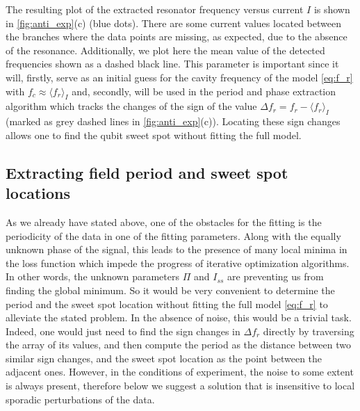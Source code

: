 \documentclass[%
 aip,
 amsmath,amssymb,
 reprint,%
]{revtex4-1}
\begin{document}
The resulting plot of the extracted resonator frequency versus current $I$ is shown in \autoref{fig:anti_exp}(c) (blue dots). There are some current values located between the branches where the data points are missing, as expected, due to the absence of the resonance. Additionally, we plot here the mean value of the detected frequencies shown as a dashed black line. This parameter is important since it will, firstly, serve as an initial guess for the cavity frequency of the model \eqref{eq:f_r} with $f_c \approx \langle f_r \rangle_{I}$ and, secondly, will be used in the period and phase extraction algorithm which tracks the changes of the sign of the value $\Delta f_r = f_r - \langle f_r \rangle_{I}$ (marked as grey dashed lines in \autoref{fig:anti_exp}(c)). Locating these sign changes allows one to find the qubit sweet spot without fitting the full model.

\subsection{Extracting field period and sweet spot locations}

As we already have stated above, one of the obstacles for the fitting is the periodicity of the data in one of the fitting parameters. Along with the equally unknown phase of the signal, this leads to the presence of many local minima in the loss function which impede the progress of iterative optimization algorithms. In other words, the unknown parameters $\Pi$ and $I_{ss}$ are preventing us from finding the global minimum. So it would be very convenient to determine the period and the sweet spot location without fitting the full model \eqref{eq:f_r} to alleviate the stated problem. In the absence of noise, this would be a trivial task. Indeed, one would just need to find the sign changes in $ \Delta f_r $ directly by traversing the array of its values, and then compute the period as the distance between two similar sign changes, and the sweet spot location as the point between the adjacent ones. However, in the conditions of experiment, the noise to some extent is always present, therefore below we suggest a solution that is insensitive to local sporadic perturbations of the data.
\end{document}
